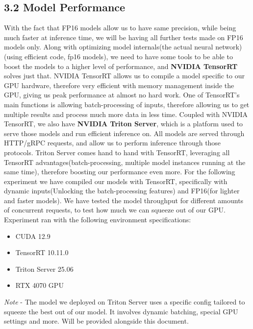 \documentclass[
]{article}
\providecommand{\tightlist}{%
  \setlength{\itemsep}{0pt}\setlength{\parskip}{0pt}}
\begin{document}
\newpage{}

\subsection{3.2 Model Performance}\label{model-performance}

With the fact that FP16 models allow us to have same precision, while
being much faster at inference time, we will be having all further tests
made on FP16 models only. \newline Along with optimizing model
internals(the actual neural network)(using efficient code, fp16 models),
we need to have some tools to be able to boost the models to a higher
level of performance, and \textbf{NVIDIA TensorRT} solves just that.
NVIDIA TensorRT allows us to compile a model specific to our GPU
hardware, therefore very efficient with memory management inside the
GPU, giving us peak performance at almost no hard work. One of
TensorRT's main functions is allowing batch-processing of inputs,
therefore allowing us to get multiple results and process much more data
in less time. \newline Coupled with NVIDIA TensorRT, we also have
\textbf{NVIDIA Triton Server}, which is a platform used to serve those
models and run efficient inference on. All models are served through
HTTP/gRPC requests, and allow us to perform inference through those
protocols. Triton Server comes hand to hand with TensorRT, leveraging
all TensorRT advantages(batch-processing, multiple model instances
running at the same time), therefore boosting our performance even more.
\newline For the following experiment we have compiled our models with
TensorRT, specifically with dynamic inputs(Unlocking the
batch-processing features) and FP16(for lighter and faster models). We
have tested the model throughput for different amounts of concurrent
requests, to test how much we can squeeze out of our GPU. \newline
Experiment ran with the following environment specifications:

\begin{itemize}
\tightlist
\item
  CUDA 12.9
\item
  TensorRT 10.11.0
\item
  Triton Server 25.06
\item
  RTX 4070 GPU
\end{itemize}

\emph{Note} - The model we deployed on Triton Server uses a specific
config tailored to squeeze the best out of our model. It involves
dynamic batching, special GPU settings and more. Will be provided
alongside this document.
\end{document}
